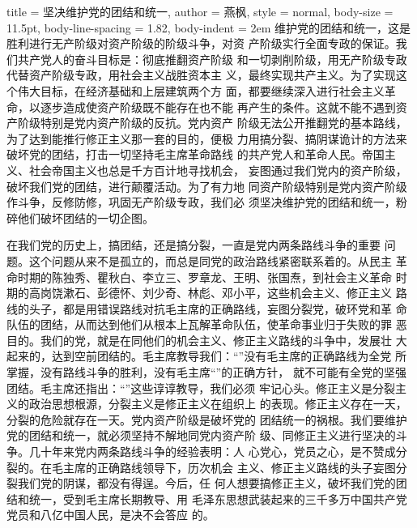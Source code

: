 \begin{hongqiarticle}{
        title  = {坚决维护党的团结和统一},
        author = {燕枫},
        style  = normal,
        body-size = 11.5pt,
        body-line-spacing = 1.82,
        body-indent = 2em
    }
    维护党的团结和统一，这是胜利进行无产阶级对资产阶级的阶级斗争，对资
    产阶级实行全面专政的保证。我们共产党人的奋斗目标是：彻底推翻资产阶级
    和一切剥削阶级，用无产阶级专政代替资产阶级专政，用社会主义战胜资本主
    义，最终实现共产主义。为了实现这个伟大目标，在经济基础和上层建筑两个方
    面，都要继续深入进行社会主义革命，以逐步造成使资产阶级既不能存在也不能
    再产生的条件。这就不能不遇到资产阶级特别是党内资产阶级的反抗。党内资产
    阶级无法公开推翻党的基本路线，为了达到能推行修正主义那一套的目的，便极
    力用搞分裂、搞阴谋诡计的方法来破坏党的团结，打击一切坚持毛主席革命路线
    的共产党人和革命人民。帝国主义、社会帝国主义也总是千方百计地寻找机会，
    妄图通过我们党内的资产阶级，破坏我们党的团结，进行颠覆活动。为了有力地
    同资产阶级特别是党内资产阶级作斗争，反修防修，巩固无产阶级专政，我们必
    须坚决维护党的团结和统一，粉碎他们破坏团结的一切企图。
    
    在我们党的历史上，搞团结，还是搞分裂，一直是党内两条路线斗争的重要
    问题。这个问题从来不是孤立的，而总是同党的政治路线紧密联系着的。从民主
    革命时期的陈独秀、瞿秋白、李立三、罗章龙、王明、张国焘，到社会主义革命
    时期的高岗饶漱石、彭德怀、刘少奇、林彪、邓小平，这些机会主义、修正主义
    路线的头子，都是用错误路线对抗毛主席的正确路线，妄图分裂党，破环党和革
    命队伍的团结，从而达到他们从根本上瓦解革命队伍，使革命事业归于失败的罪
    恶目的。我们的党，就是在同他们的机会主义、修正主义路线的斗争中，发展壮
    大起来的，达到空前团结的。毛主席教导我们：“”没有毛主席的正确路线为全党
    所掌握，没有路线斗争的胜利，没有毛主席“”的正确方针，
    就不可能有全党的坚强团结。毛主席还指出：“”这些谆谆教导，我们必须
    牢记心头。修正主义是分裂主义的政治思想根源，分裂主义是修正主义在组织上
    的表现。修正主义存在一天，分裂的危险就存在一天。党内资产阶级是破坏党的
    团结统一的祸根。我们要维护党的团结和统一，就必须坚持不解地同党内资产阶
    级、同修正主义进行坚决的斗争。几十年来党内两条路线斗争的经验表明：人
    心党心，党员之心，是不赞成分裂的。在毛主席的正确路线领导下，历次机会
    主义、修正主义路线的头子妄图分裂我们党的阴谋，都没有得逞。今后，任
    何人想要搞修正主义，破坏我们党的团结和统一，受到毛主席长期教导、用
    毛泽东思想武装起来的三千多万中国共产党党员和八亿中国人民，是决不会答应
    的。
    

\end{hongqiarticle}
